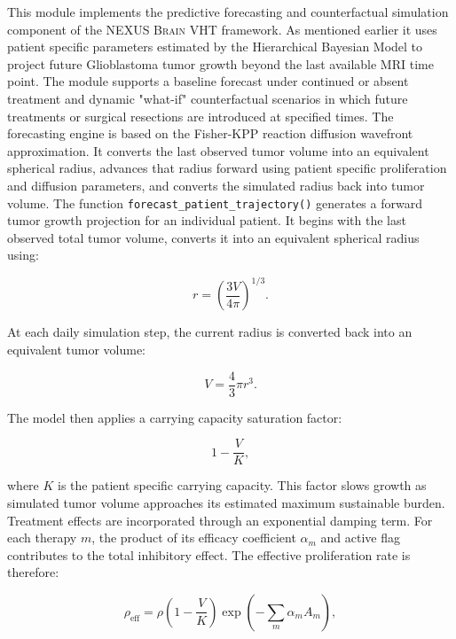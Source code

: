 This module implements the predictive forecasting and counterfactual simulation component of the \textsc{NEXUS Brain} VHT framework. As mentioned earlier it uses patient specific parameters estimated by the Hierarchical Bayesian Model to project future Glioblastoma tumor growth beyond the last available MRI time point. The module supports a baseline forecast under continued or absent treatment and dynamic "what-if" counterfactual scenarios in which future treatments or surgical resections are introduced at specified times. The forecasting engine is based on the Fisher-KPP reaction diffusion wavefront approximation. It converts the last observed tumor volume into an equivalent spherical radius, advances that radius forward using patient specific proliferation and diffusion parameters, and converts the simulated radius back into tumor volume. The function \texttt{forecast\_patient\_trajectory()} generates a forward tumor growth projection for an individual patient. It begins with the last observed total tumor volume, converts it into an equivalent spherical radius using:

\begin{equation}
r = \left(\frac{3V}{4\pi}\right)^{1/3}.
\end{equation}

At each daily simulation step, the current radius is converted back into an equivalent tumor volume:

\begin{equation}
V = \frac{4}{3}\pi r^3.
\end{equation}

The model then applies a carrying capacity saturation factor:

\begin{equation}
1 - \frac{V}{K},
\end{equation}

where $K$ is the patient specific carrying capacity. This factor slows growth as simulated tumor volume approaches its estimated maximum sustainable burden. Treatment effects are incorporated through an exponential damping term. For each therapy $m$, the product of its efficacy coefficient $\alpha_m$ and active flag contributes to the total inhibitory effect. The effective proliferation rate is therefore:

\begin{equation}
\rho_{\text{eff}} = \rho \left(1 - \frac{V}{K}\right) \exp\left(-\sum_m \alpha_m A_m\right),
\end{equation}

